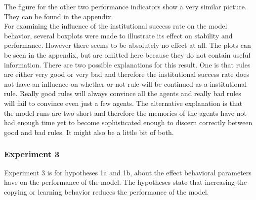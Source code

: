 \documentclass[a4paper]{article}
\begin{document}
The figure for the other two performance indicators show a very similar picture. They can be found in the appendix.\\
For examining the influence of the institutional success rate on the model behavior, several boxplots were made to illustrate its 
effect on stability and performance. However there seems to be absolutely no effect at all. The plots can be seen in the appendix, but are
omitted here because they do not contain useful information. There are two possible explanations for this result. One is that 
rules are either very good or very bad and therefore the institutional success rate does not have an influence on 
whether or not rule will be continued as a institutional rule. Really good rules will always convince all the agents and really bad 
rules will fail to convince even just a few agents. The alternative explanation is that the model runs are two short and therefore 
the memories of the agents have not had enough time yet to become sophisticated enough to discern correctly between good and bad rules.
It might also be a little bit of both.
\clearpage
\subsubsection{Experiment 3}
Experiment 3 is for hypotheses 1a and 1b, about the effect behavioral parameters have on the performance of the model. 
The hypotheses state that increasing the copying or learning behavior reduces the performance of the model.
\clearpage
\end{document}
